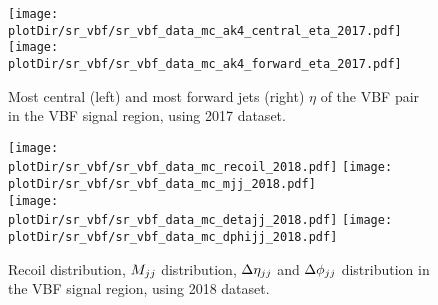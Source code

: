 \begin{figure}[htbp]
    \begin{center}
        \texttt{[image: \\plotDir/sr\_vbf/sr\_vbf\_data\_mc\_ak4\_central\_eta\_2017.pdf]}
        \texttt{[image: \\plotDir/sr\_vbf/sr\_vbf\_data\_mc\_ak4\_forward\_eta\_2017.pdf]}
    \end{center}
    \caption{Most central (left) and most forward jets (right) $\eta$ of the VBF pair in the VBF signal region, using 2017 dataset.}
    \label{fig:SR_eta_vbfhinv_2017_mtr}
\end{figure}




\begin{figure}[htbp]
    \begin{center}
        \texttt{[image: \\plotDir/sr\_vbf/sr\_vbf\_data\_mc\_recoil\_2018.pdf]}
        \texttt{[image: \\plotDir/sr\_vbf/sr\_vbf\_data\_mc\_mjj\_2018.pdf]} \\
        \texttt{[image: \\plotDir/sr\_vbf/sr\_vbf\_data\_mc\_detajj\_2018.pdf]}
        \texttt{[image: \\plotDir/sr\_vbf/sr\_vbf\_data\_mc\_dphijj\_2018.pdf]}
    \end{center}
    \caption{Recoil distribution, $M_{jj}$ distribution, $\Delta \eta_{jj}$ and $\Delta \phi_{jj}$
    distribution in the VBF signal region, using 2018 dataset.}
    \label{fig:SR_pre_vbfhinv_2018_mtr}
\end{figure}

